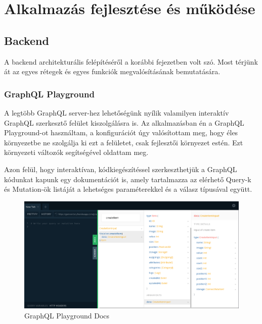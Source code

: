 \chapter{Alkalmazás fejlesztése és működése}

\section{Backend}
A backend architekturális felépítéséről a korábbi fejezetben volt szó. 
Most térjünk át az egyes rétegek és egyes funkciók megvalósításának bemutatására.

\subsection{GraphQL Playground}
A legtöbb GraphQL server-hez lehetőségünk nyílik valamilyen interaktív GraphQL szerkesztő felület kiszolgálásra is.
Az alkalmazásban én a GraphQL Playground-ot használtam, a konfigurációt úgy valósítottam meg, hogy éles környezetbe ne szolgálja ki ezt a felületet, csak fejlesztői környezet estén.
Ezt környezeti változók segítségével oldattam meg.

Azon felül, hogy interaktívan, kódkiegészítéssel szerkeszthetjük a GraphQL kódunkat kapunk egy dokumentációt is, amely tartalmazza az elérhető Query-k és Mutation-ök listáját a lehetséges paraméterekkel és a válasz típusával együtt.

\begin{figure}[!ht]
  \centering
  \includegraphics[width=150mm, keepaspectratio]{figures/playground_docs.png}
  \caption{GraphQL Playground Docs}
  \label{fig:playgroundDocs}
\end{figure}

